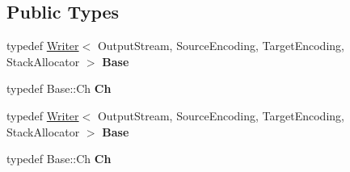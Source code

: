 \subsection*{Public Types}
\begin{DoxyCompactItemize}
\item 
\mbox{\label{classPrettyWriter_ab6074f4c51db129e195bc5752eb2b448}} 
typedef \hyperlink{classWriter}{Writer}$<$ Output\+Stream, Source\+Encoding, Target\+Encoding, Stack\+Allocator $>$ {\bfseries Base}
\item 
\mbox{\label{classPrettyWriter_ae5f474c0f087932d795c1cb4b9d0c312}} 
typedef Base\+::\+Ch {\bfseries Ch}
\item 
\mbox{\label{classPrettyWriter_ab6074f4c51db129e195bc5752eb2b448}} 
typedef \hyperlink{classWriter}{Writer}$<$ Output\+Stream, Source\+Encoding, Target\+Encoding, Stack\+Allocator $>$ {\bfseries Base}
\item 
\mbox{\label{classPrettyWriter_ae5f474c0f087932d795c1cb4b9d0c312}} 
typedef Base\+::\+Ch {\bfseries Ch}
\end{DoxyCompactItemize}
